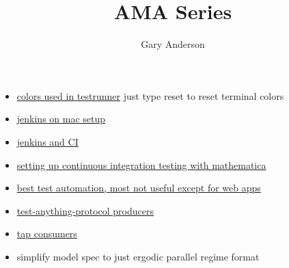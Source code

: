 \documentclass[hyperref]{labbook}
\begin{document}
\frontmatter
\title{AMA Series}
\author{Gary Anderson }
\maketitle

\printindex
\tableofcontents




\mainmatter



\begin{itemize}
\item \href{https://mathematica.stackexchange.com/questions/164468/wolframscript-how-to-print-in-color/164487#164487}{colors used in testrunner}  just type reset to reset terminal colors
\end{itemize}


\begin{itemize}
\item \href{https://www.blazemeter.com/blog/how-start-working-github-plugin-jenkins}{jenkins on mac setup}
\item \href{https://dev.to/iriskatastic/start-continuous-integration-with-jenkins-pipeline-4edb}{jenkins and CI}
\end{itemize}

\begin{itemize}
\item \href{https://mathematica.stackexchange.com/questions/163912/automating-testing-of-mathematica-code}{setting up continuous integration testing with mathematica}
\item \href{https://medium.com/@briananderson2209/best-automation-testing-tools-for-2018-top-10-reviews-8a4a19f664d2}{best test automation, most not useful except for web apps}
\item \href{https://testanything.org/producers.html}{test-anything-protocol producers}
\item \href{https://testanything.org/consumers.html}{tap consumers}
\end{itemize}


\begin{itemize}
\item simplify model spec to just ergodic parallel regime format
\end{itemize}
\end{document}
